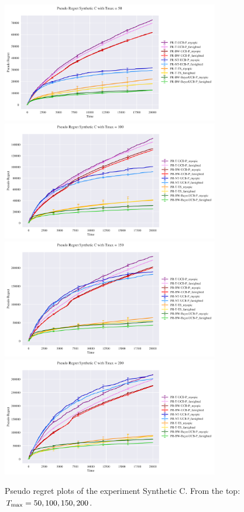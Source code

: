 \begin{figure}[H]
	
	\centering
	\includegraphics[width=9.5cm]{./images/ANALYTICS/experiment_C_50 ANALYTICS.png}\quad\includegraphics[width=9.5cm]{./images/ANALYTICS/experiment_C_100 ANALYTICS.png}
	\includegraphics[width=9.5cm]{./images/ANALYTICS/experiment_C_150 ANALYTICS.png}\quad\includegraphics[width=9.5cm]{./images/ANALYTICS/experiment_C_200 ANALYTICS.png}
	\caption{Pseudo regret plots of the experiment Synthetic C. From the top: $T_{\textnormal{max}} = 50, 100, 150, 200$.}
	\label{f:c}
	
\end{figure}


